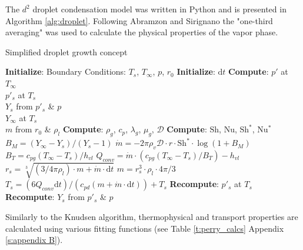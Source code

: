 \documentclass[12pt]{article}
\numberwithin{equation}{section}
\begin{document}
The $d^2$ droplet condensation model was written in Python and is presented in Algorithm \ref{alg:droplet}. Following Abramzon and Sirignano \cite{abramzon1989droplet} the "one-third averaging" was used to calculate the physical properties of the vapor phase.
\begin{algorithm}[H]
    \caption{Simplified droplet growth concept}
    \label{alg:droplet}
    \begin{algorithmic}[1]
    \State \textbf{Initialize}: Boundary Conditions: $T_{s}$, $T_{\infty}$, $p$, $r_{0}$ 
    \State \textbf{Initialize}: $\mathrm{d}t$ 
    \State \textbf{Compute}: $p'$ at $T_{\infty}$\\ 
    \quad \quad \quad \quad \quad $p'_{s}$ at $T_{s}$ \\
    \quad \quad \quad \quad \quad$Y_{s}$ from $p'_{s}$ \& $p$\\
    \quad \quad \quad \quad \quad$Y_{\infty}$ at $T_{s}$  \\
    
    \quad \quad \quad \quad \quad$m$ from $r_{0}$ \& $\rho_{l}$ 
    \State \textbf{Compute}: $\rho_{g}$, $c_{p}$, $\lambda_{g}$, $\mu_{g}$, $\mathcal{D}$ 
    \State \textbf{Compute}: $\mathrm{Sh}$, $\mathrm{Nu}$, $\mathrm{Sh^*}$, $\mathrm{Nu^*}$ 
    \State $B_{M}=(Y_{\infty}-Y_{s})/(Y_{s}-1)$
    \State $\dot{m}=-2\pi\rho_{v}\mathcal{D}\cdot r \cdot \mathrm{Sh^*}\cdot \log(1+B_{M})$
    \State $B_{T}=c_{pg}(T_{\infty}-T_{s})/h_{vl}$ 
    \State $Q_{conv}=\dot{m}\cdot (c_{pg}(T_{\infty}-T_{s})/B_{T})-h_{vl}$
    \State $r_{s}=\sqrt[3]{(3/4\pi \rho_{l})\cdot m+\dot{m}\cdot \mathrm{d}t}$
    \State $m=r_{s}^{3}\cdot \rho_{l}\cdot 4\pi/3$
    \State $T_{s}=(6 Q_{conv}\mathrm{d}t)/(c_{pd}(m+\dot{m}\cdot \mathrm{d}t))+T_{s}$
    \State \textbf{Recompute}: $p'_{s}$ at $T_{s}$
    \State \textbf{Recompute}: $Y_{s}$ from $p'_{s}$ \& $p$
    \EndFor
    
    \end{algorithmic}
\end{algorithm}
Similarly to the Knudsen algorithm, thermophysical and transport properties are calculated using various
fitting functions (see Table \ref{t:perry_calcs} Appendix \ref{s:appendix B}).
\end{document}
